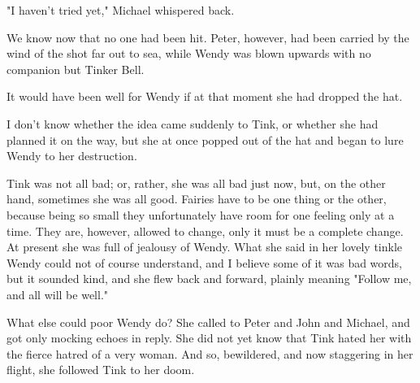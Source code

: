 "I haven't tried yet," Michael whispered back.

We know now that no one had been hit.
Peter, however, had been carried by the wind of the shot far out to sea,
while Wendy was blown upwards with no companion but Tinker Bell.

It would have been well for Wendy if at that moment she had dropped the hat.

I don't know whether the idea came suddenly to Tink, or whether she had planned it on the way,
but she at once popped out of the hat and began to lure Wendy to her destruction.

Tink was not all bad;
or, rather, she was all bad just now, but, on the other hand, sometimes she was all good.
Fairies have to be one thing or the other,
because being so small they unfortunately have room for one feeling only at a time.
They are, however, allowed to change, only it must be a complete change.
At present she was full of jealousy of Wendy.
What she said in her lovely tinkle Wendy could not of course understand,
and I believe some of it was bad words, but it sounded kind,
and she flew back and forward, plainly meaning "Follow me, and all will be well."

What else could poor Wendy do?
She called to Peter and John and Michael,
and got only mocking echoes in reply.
She did not yet know that Tink hated her with the fierce hatred of a very woman.
And so, bewildered, and now staggering in her flight,
she followed Tink to her doom.

\endinput
